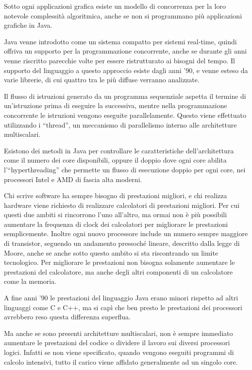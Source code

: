 \documentclass{article}
\numberwithin{equation}{subsection}
\begin{document}
Sotto ogni applicazioni grafica esiste un modello di concorrenza per la loro notevole complessità algoritmica, anche se non si programmano più applicazioni 
grafiche in Java. 

Java venne introdotto come un sistema compatto per sistemi real-time, quindi offriva un supporto per la programmazione concorrente, anche se durante gli anni venne 
riscritto parecchie volte per essere ristrutturato ai bisogni del tempo. 
Il supporto del linguaggio a questo approccio esiste dagli anni '90, e venne esteso da varie librerie, di cui quattro tra le più diffuse verranno analizzate. 

Il flusso di istruzioni generato da un programma sequenziale aspetta il termine di un'istruzione prima di eseguire la successiva, mentre nella programmazione 
concorrente le istruzioni vengono eseguite parallelamente.  
Questo viene effettuato utilizzando i ``thread'', un meccanismo di parallelismo interno alle architetture multiscalari. 

Esistono dei metodi in Java per controllare le caratteristiche dell'architettura come il numero dei core disponibili, oppure il doppio dove ogni core abilita l'``hyperthreading'' 
che permette un flusso di esecuzione doppio per ogni core, nei processori Intel e AMD di fascia alta moderni. 

Chi scrive software ha sempre bisogno di prestazioni migliori, e chi realizza hardware viene richiesto di realizzare calcolatori di prestazioni migliori. Per cui 
questi due ambiti si rincorrono l'uno all'altro, ma ormai non è più possibili aumentare la frequenza di clock dei calcolatori per migliorare le prestazioni semplicemente. 
Inoltre ogni nuovo processore include un numero sempre maggiore di transistor, seguendo un andamento pressoché lineare, descritto dalla legge di Moore, anche se anche sotto 
questo ambito si sta riscontrando un limite tecnologico. Per migliorare le prestazioni non bisogna solamente aumentare le prestazioni del calcolatore, ma anche degli altri 
componenti di un calcolatore come la memoria. 


A fine anni '90 le prestazioni del linguaggio Java erano minori rispetto ad altri linguaggi come C e C++, ma si capì che ben presto le prestazioni dei processori avrebbero 
reso questa differenza superflua. 


Ma anche se sono presenti architetture multiscalari, non è sempre immediato aumentare le prestazioni del codice o dividere il lavoro sui diversi processori logici. Infatti 
se non viene specificato, quando vengono eseguiti programmi di calcolo intensivi, tutto il carico viene affidato generalmente ad un singolo core. 
\end{document}
